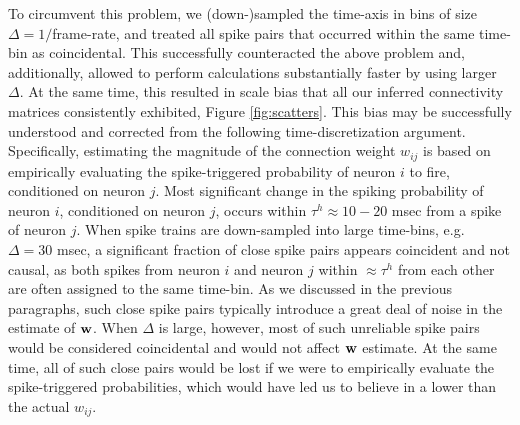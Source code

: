 To circumvent this problem, we (down-)sampled the time-axis in bins of size $\Delta=1/$frame-rate, and treated all spike pairs that occurred within the same time-bin as coincidental. This successfully counteracted the above problem and, additionally, allowed to perform calculations substantially faster by using larger $\Delta$. At the same time, this resulted in scale bias that all our inferred  connectivity matrices consistently exhibited, Figure \ref{fig:scatters}. This bias may be successfully understood and corrected from the following time-discretization argument. Specifically, estimating the magnitude of the connection weight $w_{ij}$ is based on empirically evaluating the spike-triggered probability of neuron $i$ to fire, conditioned on neuron $j$. Most significant change in the spiking probability of neuron $i$, conditioned on neuron $j$, occurs within $\tau^h \approx 10-20$ msec from a spike of neuron $j$. 
When spike trains are down-sampled into large time-bins, e.g. $\Delta = 30$ msec, a significant fraction of close spike pairs appears coincident and not causal, as both spikes from neuron $i$ and neuron $j$ within $\approx \tau^h$ from each other are often assigned to the same time-bin. As we discussed in the previous paragraphs, such close spike pairs typically introduce a great deal of noise in the estimate of $\mathbf{w}$. When $\Delta$ is large, however, most of such unreliable spike pairs would be considered coincidental and would not affect $\mathbf{w}$ estimate. At the same time, all of such close pairs would be lost if we were to empirically evaluate the spike-triggered probabilities, which would have led us to believe in a lower than the actual  $w_{ij}$.

